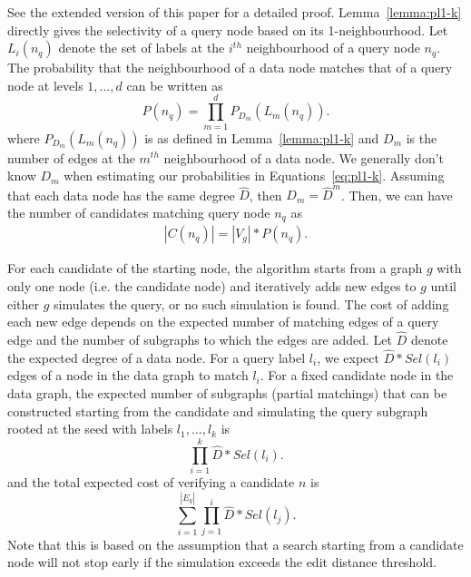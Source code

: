 \documentclass{sigmod}
\begin{document}
See the extended version of this paper \cite{eteq2016} for a detailed proof. 
Lemma~\ref{lemma:pl1-k} directly gives the selectivity of a query node based on its 1-neighbourhood.
Let $L_i(n_q)$ denote the set of labels at the $i^{th}$ neighbourhood of a query node $n_q$.
The probability that the neighbourhood of a data node matches that of a query node at levels $1, \ldots, d$
can be written as 
\begin{equation}
\label{eq:plm1-d}
P(n_q) =\prod_{m = 1}^dP_{D_m}(L_m(n_q)). 
\end{equation}
where $P_{D_m}(L_m(n_q))$ is as defined in Lemma~\ref{lemma:pl1-k} and $D_m$ is the number of edges at the $m^{th}$ neighbourhood of a data node.
We generally don't know $D_m$ when estimating our probabilities in Equations~\ref{eq:pl1-k}.
Assuming that each data node has the same degree $\hat{D}$, then $D_m=\hat{D}^m$. 
Then, we can have the number of candidates matching query node $n_q$ as 
\begin{align*}
|C(n_q)| = |V_g| * P(n_q).
\end{align*}

For each candidate of the starting node, the algorithm starts from a graph $g$ with only one node (i.e. the candidate node) and iteratively adds new edges to $g$ until either $g$ simulates the query, or no such simulation is found.
The cost of adding each new edge depends on the expected number of matching edges of a query edge and the number of subgraphs to which the edges are added.
Let $\hat{D}$ denote the expected degree of a data node.
For a query label $l_i$, we expect $\hat{D}*Sel(l_i)$ edges of a node in the data graph to match $l_i$. 
For a fixed candidate node in the data graph, the expected number of subgraphs (partial matchings) that can be constructed starting from the candidate and simulating the query subgraph rooted at the seed with labels $l_1, \ldots, l_k$ is 
\[
\prod_{i=1}^{k}\hat{D}*Sel(l_i). \nonumber
\]
and the total expected cost of verifying a candidate $n$ is
\begin{equation}
\label{eq:cost-verifying-n}
\sum_{i=1}^{|E_q|}\prod_{j = 1}^i\hat{D}*Sel(l_j).
\end{equation}
%
Note that this is based on the assumption that a search starting from a candidate node will not stop early if the simulation exceeds the edit distance threshold. 
\end{document}
